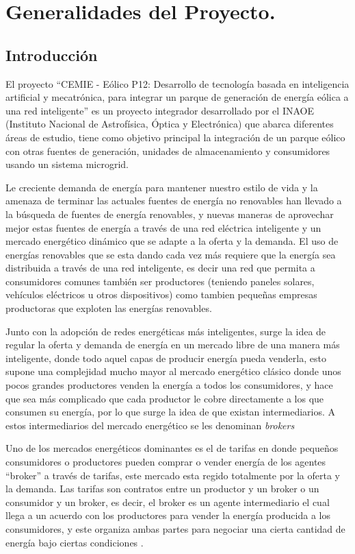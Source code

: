 \chapter{Generalidades del Proyecto.}

\section*{Introducción}
El proyecto ``CEMIE - Eólico P12: Desarrollo de tecnología basada en inteligencia artificial y mecatrónica, para integrar un parque de generación de energía eólica a una red inteligente'' es un proyecto integrador desarrollado por el INAOE (Instituto Nacional de Astrofísica, Óptica y Electrónica) que abarca diferentes áreas de estudio, tiene como objetivo principal la integración de un parque eólico con otras fuentes de generación, unidades de almacenamiento y consumidores usando un
sistema microgrid.

Le creciente demanda de energía para mantener nuestro estilo de vida y la amenaza de terminar las actuales fuentes de energía no renovables han llevado a la búsqueda de fuentes de energía renovables, y nuevas maneras de aprovechar mejor estas fuentes de energía a través de una red eléctrica inteligente y un mercado energético dinámico que se adapte a la oferta y la demanda.
El uso de energías renovables que se esta dando cada vez más requiere que la energía sea distribuida a través de una red inteligente, es decir una red que permita a consumidores comunes también ser productores (teniendo paneles solares, vehículos eléctricos u otros dispositivos) como tambien pequeñas empresas productoras que exploten las energías renovables.

Junto con la adopción de redes energéticas más inteligentes, surge la idea de regular la oferta y demanda de energía en un mercado libre de una manera más inteligente, donde todo aquel capas de producir energía pueda venderla, esto supone una complejidad mucho mayor al mercado energético clásico donde unos pocos grandes productores venden la energía a todos los consumidores, y hace que sea más complicado que cada productor le cobre directamente a los que consumen su energía, por lo que surge la idea de que existan intermediarios. A estos intermediarios del mercado energético se les denominan \textit{brokers}

Uno de los mercados energéticos dominantes es el de tarifas en donde pequeños consumidores o productores pueden comprar o vender energía de los agentes ``broker'' a través de tarifas, este mercado esta regido totalmente por la oferta y la demanda.
Las tarifas son contratos entre un productor y un broker o un consumidor y un broker, es decir, el broker es un agente intermediario el cual llega a un acuerdo con los productores para vender la energía producida a los consumidores, y este organiza ambas partes para negociar una cierta cantidad de energía bajo ciertas condiciones \cite{MPAlonsoAYRGonzalezDesarrolloDeTec}.

